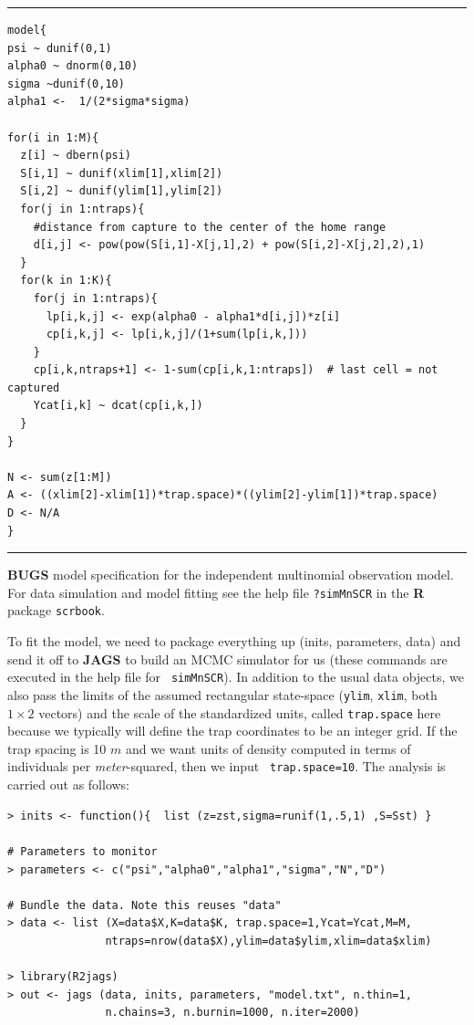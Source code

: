 \begin{panel}[htp]
\centering
\rule[0.15in]{\textwidth}{.03in}
{\small
\begin{verbatim}
model{
psi ~ dunif(0,1)
alpha0 ~ dnorm(0,10)
sigma ~dunif(0,10)
alpha1 <-  1/(2*sigma*sigma)

for(i in 1:M){
  z[i] ~ dbern(psi)
  S[i,1] ~ dunif(xlim[1],xlim[2])
  S[i,2] ~ dunif(ylim[1],ylim[2])
  for(j in 1:ntraps){
    #distance from capture to the center of the home range
    d[i,j] <- pow(pow(S[i,1]-X[j,1],2) + pow(S[i,2]-X[j,2],2),1)
  }
  for(k in 1:K){
    for(j in 1:ntraps){
      lp[i,k,j] <- exp(alpha0 - alpha1*d[i,j])*z[i]
      cp[i,k,j] <- lp[i,k,j]/(1+sum(lp[i,k,]))
    }
    cp[i,k,ntraps+1] <- 1-sum(cp[i,k,1:ntraps])  # last cell = not captured
    Ycat[i,k] ~ dcat(cp[i,k,])
  }
}

N <- sum(z[1:M])
A <- ((xlim[2]-xlim[1])*trap.space)*((ylim[2]-ylim[1])*trap.space)
D <- N/A
}
\end{verbatim}
}
\rule[-0.15in]{\textwidth}{.03in}
\caption{
{\bf BUGS} model specification for the independent multinomial
observation model. For data simulation and model fitting see the
help file \mbox{\tt ?simMnSCR} in the {\bf R} package \mbox{\tt scrbook}.
}
\label{poisson-mn.panel.mn}
\end{panel}

To fit the model, we need to package everything up (inits, parameters,
data) and send it off to \mbox{\bf JAGS} to build an MCMC simulator
for us (these commands are executed in the help file for \mbox{\tt
  simMnSCR}). In addition to the usual data objects, we also pass
the limits of the assumed rectangular state-space (\mbox{\tt ylim},
\mbox{\tt xlim}, both $1 \times 2$ vectors) and the scale of the
standardized units, called \mbox{\tt trap.space} here because we
typically will define the trap coordinates to be an integer grid. If
the trap spacing is 10 $m$ and we want units of density computed in
terms of individuals  per {\it meter}-squared, then we input \mbox{\tt
  trap.space=10}. The analysis is carried out as follows:
\begin{samepage}
{\small
\begin{verbatim}
> inits <- function(){  list (z=zst,sigma=runif(1,.5,1) ,S=Sst) }

# Parameters to monitor
> parameters <- c("psi","alpha0","alpha1","sigma","N","D")

# Bundle the data. Note this reuses "data"
> data <- list (X=data$X,K=data$K, trap.space=1,Ycat=Ycat,M=M,
               ntraps=nrow(data$X),ylim=data$ylim,xlim=data$xlim)

> library(R2jags)
> out <- jags (data, inits, parameters, "model.txt", n.thin=1,
               n.chains=3, n.burnin=1000, n.iter=2000)
\end{verbatim}
}
\end{samepage}

